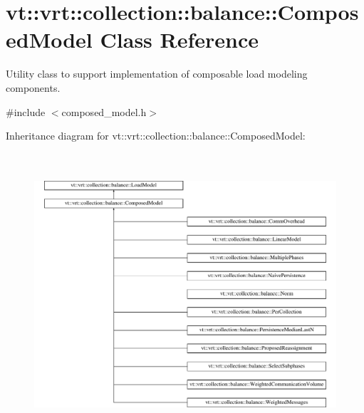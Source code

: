 \hypertarget{classvt_1_1vrt_1_1collection_1_1balance_1_1_composed_model}{}\section{vt\+:\+:vrt\+:\+:collection\+:\+:balance\+:\+:Composed\+Model Class Reference}
\label{classvt_1_1vrt_1_1collection_1_1balance_1_1_composed_model}


Utility class to support implementation of composable load modeling components.  




{\ttfamily \#include $<$composed\+\_\+model.\+h$>$}

Inheritance diagram for vt\+:\+:vrt\+:\+:collection\+:\+:balance\+:\+:Composed\+Model\+:\begin{figure}[H]
\begin{center}
\leavevmode
\includegraphics[height=10.489914cm]{classvt_1_1vrt_1_1collection_1_1balance_1_1_composed_model}
\end{center}
\end{figure}
